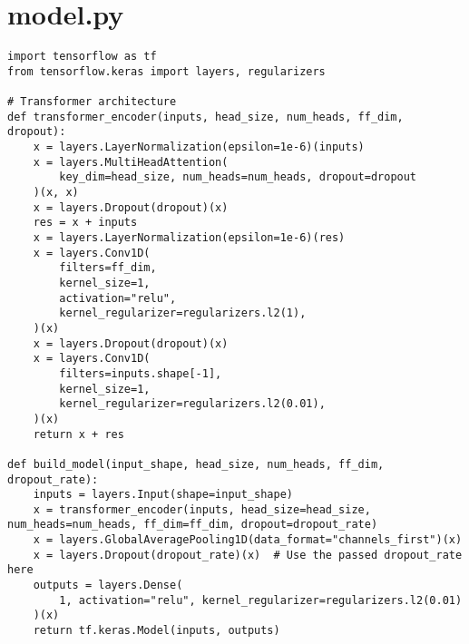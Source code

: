 \section{model.py}
\UseRawInputEncoding
\begin{lstlisting}
import tensorflow as tf
from tensorflow.keras import layers, regularizers

# Transformer architecture
def transformer_encoder(inputs, head_size, num_heads, ff_dim, dropout):
    x = layers.LayerNormalization(epsilon=1e-6)(inputs)
    x = layers.MultiHeadAttention(
        key_dim=head_size, num_heads=num_heads, dropout=dropout
    )(x, x)
    x = layers.Dropout(dropout)(x)
    res = x + inputs
    x = layers.LayerNormalization(epsilon=1e-6)(res)
    x = layers.Conv1D(
        filters=ff_dim,
        kernel_size=1,
        activation="relu",
        kernel_regularizer=regularizers.l2(1),
    )(x)
    x = layers.Dropout(dropout)(x)
    x = layers.Conv1D(
        filters=inputs.shape[-1],
        kernel_size=1,
        kernel_regularizer=regularizers.l2(0.01),
    )(x)
    return x + res

def build_model(input_shape, head_size, num_heads, ff_dim, dropout_rate):
    inputs = layers.Input(shape=input_shape)
    x = transformer_encoder(inputs, head_size=head_size, num_heads=num_heads, ff_dim=ff_dim, dropout=dropout_rate)
    x = layers.GlobalAveragePooling1D(data_format="channels_first")(x)
    x = layers.Dropout(dropout_rate)(x)  # Use the passed dropout_rate here
    outputs = layers.Dense(
        1, activation="relu", kernel_regularizer=regularizers.l2(0.01)
    )(x)
    return tf.keras.Model(inputs, outputs)
\end{lstlisting}



